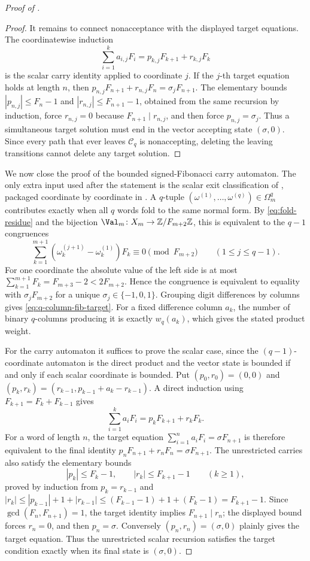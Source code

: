 \begin{proof}[Proof of ]
\begin{proof}
It remains to connect nonacceptance with the displayed target equations.  The
coordinatewise induction
\[
  \sum_{i=1}^k a_{i,j}F_i=p_{k,j}F_{k+1}+r_{k,j}F_k
\]
is the scalar carry identity applied to coordinate \(j\).  If the \(j\)-th target
equation holds at length \(n\), then
\(p_{n,j}F_{n+1}+r_{n,j}F_n=\sigma_jF_{n+1}\).  The elementary bounds
\(|p_{n,j}|\le F_n-1\) and \(|r_{n,j}|\le F_{n+1}-1\), obtained from the same
recursion by induction, force \(r_{n,j}=0\) because \(F_{n+1}\mid r_{n,j}\), and
then force \(p_{n,j}=\sigma_j\).  Thus a simultaneous target solution must end in
the vector accepting state \((\sigma,0)\).  Since every path that ever leaves
\(\mathcal C_q\) is nonaccepting, deleting the leaving transitions cannot delete
any target solution.
\end{proof}

We now close the proof of the bounded signed-Fibonacci carry automaton.  The only
extra input used after the statement is the scalar exit classification of
, packaged coordinate by
coordinate in .
A \(q\)-tuple \((\omega^{(1)},\ldots,\omega^{(q)})\in\Omega_m^q\) contributes
exactly when all \(q\) words fold to the same normal form.  By
\eqref{eq:fold-residue} and the bijection \(\Val_m\colon X_m\to
\mathbb Z/F_{m+2}\mathbb Z\), this is equivalent to the \(q-1\) congruences
\[
  \sum_{k=1}^{m+1}(\omega^{(j+1)}_k-
  \omega^{(1)}_k)F_k\equiv0\pmod {F_{m+2}}
  \qquad(1\le j\le q-1).
\]
For one coordinate the absolute value of the left side is at most
\(\sum_{k=1}^{m+1}F_k=F_{m+3}-2<2F_{m+2}\).  Hence the congruence is equivalent
to equality with \(\sigma_jF_{m+2}\) for a unique
\(\sigma_j\in\{-1,0,1\}\).  Grouping digit differences by columns gives
\eqref{eq:q-column-fib-target}.  For a fixed difference column \(a_k\), the
number of binary \(q\)-columns producing it is exactly \(w_q(a_k)\), which gives
the stated product weight.

For the carry automaton it suffices to prove the scalar case, since the
\((q-1)\)-coordinate automaton is the direct product and the vector state is
bounded if and only if each scalar coordinate is bounded.  Put
\((p_0,r_0)=(0,0)\) and
\((p_k,r_k)=(r_{k-1},p_{k-1}+a_k-r_{k-1})\).  A direct induction using
\(F_{k+1}=F_k+F_{k-1}\) gives
\[
  \sum_{i=1}^k a_iF_i=p_kF_{k+1}+r_kF_k .
\]
For a word of length \(n\), the target equation
\(\sum_{i=1}^n a_iF_i=\sigma F_{n+1}\) is therefore equivalent to the final
identity \(p_nF_{n+1}+r_nF_n=\sigma F_{n+1}\).  The unrestricted carries also
satisfy the elementary bounds
\[
  |p_k|\le F_k-1,
  \qquad |r_k|\le F_{k+1}-1
  \qquad(k\ge1),
\]
proved by induction from \(p_k=r_{k-1}\) and
\(|r_k|\le |p_{k-1}|+1+|r_{k-1}|\le (F_{k-1}-1)+1+(F_k-1)=F_{k+1}-1\).  Since
\(\gcd(F_n,F_{n+1})=1\), the target identity implies
\(F_{n+1}\mid r_n\); the displayed bound forces \(r_n=0\), and then
\(p_n=\sigma\).  Conversely \((p_n,r_n)=(\sigma,0)\) plainly gives the target
equation.  Thus the unrestricted scalar recursion satisfies the target condition
exactly when its final state is \((\sigma,0)\).


\end{proof}

